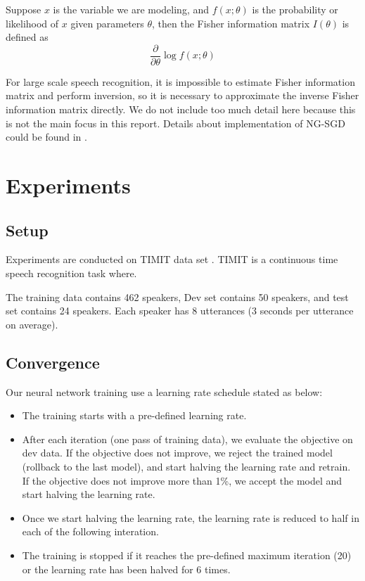 \documentclass{article}
\begin{document}
Suppose $x$ is the variable we are modeling, and $f(x;\theta)$ is the probability or likelihood of $x$ given parameters $\theta$, then the
Fisher information matrix $I(\theta)$ is defined as
\begin{equation}
\frac{\partial}{\partial\theta}\log f(x;\theta)
\end{equation}

For large scale speech recognition, it is impossible to estimate Fisher information matrix and perform inversion, so it is necessary to 
approximate the inverse Fisher information matrix directly. We do not include too much detail here because this is not the main focus 
in this report. Details about implementation of NG-SGD could be found in \cite{povey2014parallel}.

\section{Experiments}
\subsection{Setup}
Experiments are conducted on TIMIT data set \cite{timit}. TIMIT is a continuous time speech recognition task where.

The training data contains 462 speakers, Dev set contains 50 speakers, and test set contains 24 speakers. Each
speaker has 8 utterances (3 seconds per utterance on average).

\subsection{Convergence}
Our neural network training use a learning rate schedule stated as below:
\begin{itemize}
\item The training starts with a pre-defined learning rate.
\item After each iteration (one pass of training data), we evaluate the objective on dev data. If the 
objective does not improve, we reject the trained model (rollback to the last model), and start halving 
the learning rate and retrain. If the objective does not improve more than 1\%, we accept the model 
and start halving the learning rate.
\item Once we start halving the learning rate, the learning rate is reduced to half in each of the 
following interation.
\item The training is stopped if it reaches the pre-defined maximum iteration (20) or the learning rate
has been halved for 6 times.
\end{itemize}
\end{document}
